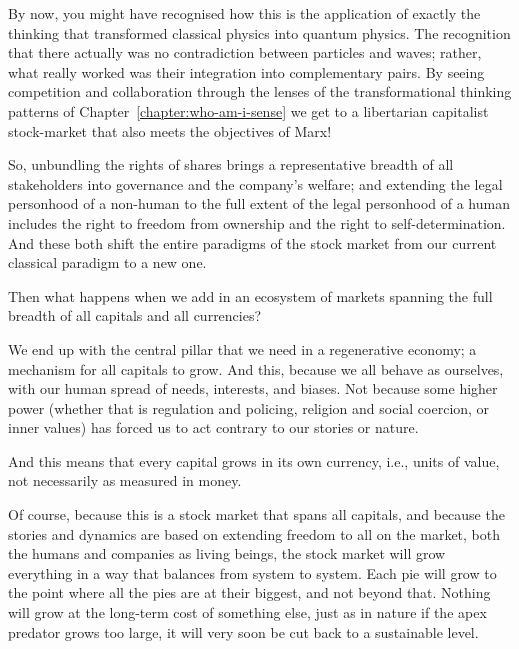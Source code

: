 By now, you might have recognised how this is the application of exactly the thinking that transformed classical physics into quantum physics. The recognition that there actually was no contradiction between particles and waves; rather, what really worked was their integration into complementary pairs. By seeing competition  and collaboration through the lenses of the transformational thinking patterns of Chapter~\ref{chapter:who-am-i-sense} we get to a libertarian capitalist stock-market that also meets the objectives of Marx! 


So, unbundling the rights of shares brings a representative breadth of all stakeholders into governance and the company’s welfare; and extending the legal personhood of a non-human to the full extent of the legal personhood of a human includes the right to freedom from ownership and the right to self-determination. And these both shift the entire paradigms of the stock market from our current classical paradigm to a new one. 


Then what happens when we add in an ecosystem of markets spanning the full breadth of all capitals and all currencies?


We end up with the central pillar that we need in a regenerative economy; a mechanism for all capitals  to grow. And this, because we all behave as ourselves, with our human spread of needs, interests, and biases.  Not because some higher power (whether that is regulation and policing, religion and social coercion, or inner values) has forced us to act contrary to our stories or nature.


And this means that every capital grows in its own currency, i.e., units of value, not necessarily as measured in money.


Of course, because this is a stock market that spans all capitals, and because the stories and dynamics are based on extending freedom to all on the market, both the humans and companies as living beings, the stock market will grow everything in a way that balances from system to system. Each pie will grow to the point where all the pies are at their biggest, and not beyond that. Nothing will grow at the long-term cost of something else, just as in nature if the apex predator grows too large, it will very soon be cut back to a sustainable level. 


